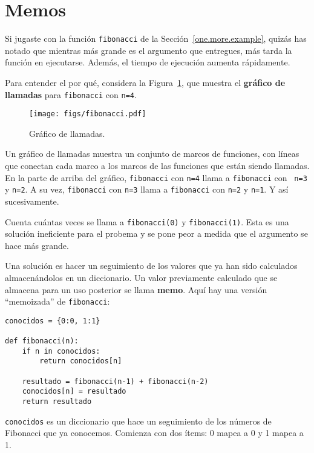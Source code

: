 \documentclass[10pt]{book}
\begin{document}
\section{Memos}
\label{memoize}

Si jugaste con la función {\tt fibonacci} de la
Sección~\ref{one.more.example}, quizás has notado que mientras más grande
es el argumento que entregues, más tarda la función en ejecutarse.
Además, el tiempo de ejecución aumenta rápidamente. 

Para entender el por qué, considera la Figura~\ref{fig.fibonacci}, que muestra
el {\bf gráfico de llamadas} para {\tt fibonacci} con {\tt n=4}.

\begin{figure}
\centerline
{\texttt{[image: figs/fibonacci.pdf]}}
\caption{Gráfico de llamadas.}
\label{fig.fibonacci}
\end{figure}

Un gráfico de llamadas muestra un conjunto de marcos de funciones, con líneas que conectan cada
marco a los marcos de las funciones que están siendo llamadas.  En la parte de arriba del
gráfico, {\tt fibonacci} con {\tt n=4} llama a {\tt fibonacci} con {\tt
n=3} y {\tt n=2}.  A su vez, {\tt fibonacci} con {\tt n=3} llama a
{\tt fibonacci} con {\tt n=2} y {\tt n=1}.  Y así sucesivamente.

Cuenta cuántas veces se llama a {\tt fibonacci(0)} y {\tt fibonacci(1)}.
Esta es una solución ineficiente para el probema y se pone peor
a medida que el argumento se hace más grande.


Una solución es hacer un seguimiento de los valores que ya han sido
calculados almacenándolos en un diccionario.   Un valor previamente calculado
que se almacena para un uso posterior se llama {\bf memo}.  Aquí hay una versión
``memoizada'' de {\tt fibonacci}:

\begin{verbatim}
conocidos = {0:0, 1:1}

def fibonacci(n):
    if n in conocidos:
        return conocidos[n]

    resultado = fibonacci(n-1) + fibonacci(n-2)
    conocidos[n] = resultado
    return resultado
\end{verbatim}
%
{\tt conocidos} es un diccionario que hace un seguimiento de los números de Fibonacci
que ya conocemos.  Comienza con
dos ítems: 0 mapea a 0 y 1 mapea a 1.
\end{document}
